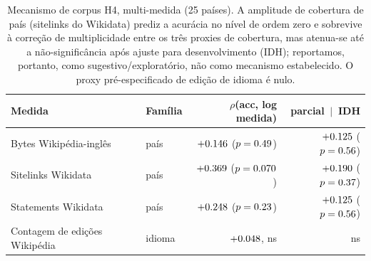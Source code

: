 \documentclass[11pt,a4paper]{article}
\begin{document}
\begin{table}[h]\centering
\caption{Mecanismo de corpus H4, multi-medida (25 países). A amplitude de cobertura
de país (sitelinks do Wikidata) prediz a acurácia no nível de ordem zero e
sobrevive à correção de multiplicidade entre os três proxies de cobertura, mas
atenua-se até a não-significância após ajuste para desenvolvimento (IDH);
reportamos, portanto, como sugestivo/exploratório, não como mecanismo estabelecido.
O proxy pré-especificado de edição de idioma é nulo.}
\label{tab:s-h4}
\small
\begin{tabular}{llrr}
\toprule
Medida & Família & $\rho$(acc, log medida) & parcial $\,\vert\,$ IDH \\
\midrule
Bytes Wikipédia-inglês       & país     & $+0.146$ ($p=0.49$) & $+0.125$ ($p=0.56$) \\
Sitelinks Wikidata  & país     & $+0.369$ ($p=0.070$) & $+0.190$ ($p=0.37$) \\
Statements Wikidata          & país     & $+0.248$ ($p=0.23$) & $+0.125$ ($p=0.56$) \\
Contagem de edições Wikipédia & idioma  & $+0.048$, ns        & ns \\
\bottomrule
\end{tabular}
\end{table}
\end{document}
